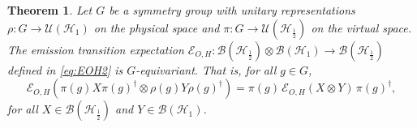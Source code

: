 \documentclass[12pt,a4paper]{article}
\newtheorem{theorem}{Theorem}[section]
\begin{document}
 \begin{theorem}\label{thm:EOH-sym}
Let $G$ be a symmetry group with unitary representations $\rho: G \to \mathcal{U}(\mathcal{H}_{1})$ on the physical space and $\pi: G \to \mathcal{U}(\mathcal{H}_{\frac{1}{2}})$ on the virtual space. The emission transition expectation $\mathcal{E}_{O,H}: \mathcal{B}(\mathcal{H}_{\frac{1}{2}}) \otimes \mathcal{B}(\mathcal{H}_{1}) \to \mathcal{B}(\mathcal{H}_{\frac{1}{2}})$ defined in \eqref{eq:EOH2} is $G$-equivariant. That is, for all $g \in G$,
\begin{equation}\label{eq:equivariance_correct}
    \mathcal{E}_{O,H}\left( \pi(g) X \pi(g)^\dagger \otimes \rho(g) Y \rho(g)^\dagger \right) = \pi(g) \, \mathcal{E}_{O,H}(X \otimes Y) \, \pi(g)^\dagger,
\end{equation}
for all $X \in \mathcal{B}(\mathcal{H}_{\frac{1}{2}})$ and $Y \in \mathcal{B}(\mathcal{H}_{1})$.
\end{theorem}
\end{document}
